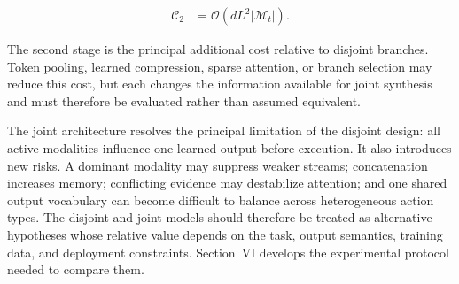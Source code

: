 \begin{equation}
\begin{aligned}
    \mathcal{C}_{2}
    &= \mathcal{O}\!\left(
       dL^2|\mathcal{M}_t|
       \right).
\end{aligned}
\label{eq:joint_stage_two_complexity}
\end{equation}

The second stage is the principal additional cost relative to disjoint branches. Token pooling, learned compression, sparse attention, or branch selection may reduce this cost, but each changes the information available for joint synthesis and must therefore be evaluated rather than assumed equivalent.

The joint architecture resolves the principal limitation of the disjoint design: all active modalities influence one learned output before execution. It also introduces new risks. A dominant modality may suppress weaker streams; concatenation increases memory; conflicting evidence may destabilize attention; and one shared output vocabulary can become difficult to balance across heterogeneous action types. The disjoint and joint models should therefore be treated as alternative hypotheses whose relative value depends on the task, output semantics, training data, and deployment constraints. Section~VI develops the experimental protocol needed to compare them.
